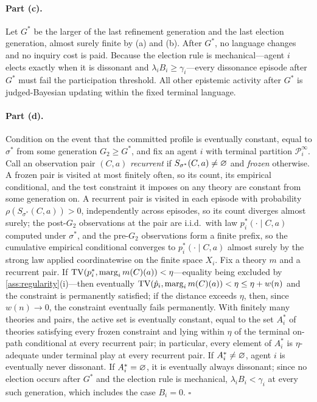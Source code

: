 \paragraph{Part (c).}
Let $G^{*}$ be the larger of the last refinement generation and the last
election generation, almost surely finite by (a) and (b).  After $G^{*}$,
no language changes and no inquiry cost is paid.  Because the election rule
is mechanical---agent $i$ elects exactly when it is dissonant and
$\lambda_iB_i\geq\gamma_i$---every dissonance episode after $G^{*}$ must
fail the participation threshold.  All other epistemic activity after
$G^{*}$ is judged-Bayesian updating within the fixed terminal language.

\paragraph{Part (d).}
Condition on the event that the committed profile is eventually constant,
equal to $\sigma^{*}$ from some generation $G_2\geq G^{*}$, and fix an
agent $i$ with terminal partition $\mathcal P_i^{\infty}$.  Call an
observation pair $(C,a)$ \emph{recurrent} if
$S_{\sigma^{*}}(C,a)\neq\varnothing$ and \emph{frozen} otherwise.  A frozen
pair is visited at most finitely often, so its count, its empirical
conditional, and the test constraint it imposes on any theory are constant
from some generation on.  A recurrent pair is visited in each episode with
probability $\rho(S_{\sigma^{*}}(C,a))>0$, independently across episodes, so
its count diverges almost surely; the post-$G_2$ observations at the pair
are i.i.d.\ with law $p_i^{*}(\cdot\mid C,a)$ computed under $\sigma^{*}$,
and the pre-$G_2$ observations form a finite prefix, so the cumulative
empirical conditional converges to $p_i^{*}(\cdot\mid C,a)$ almost surely
by the strong law applied coordinatewise on the finite space $X_i$.  Fix a
theory $m$ and a recurrent pair.  If
$\operatorname{TV}(p_i^{*},\operatorname{marg}_{i}m(C)(a))<\eta$---equality being excluded by
\cref{ass:regularity}(i)---then eventually
$\operatorname{TV}(\hat p_i,\operatorname{marg}_{i}m(C)(a))<\eta\leq\eta+w(n)$ and the constraint is
permanently satisfied; if the distance exceeds $\eta$, then, since
$w(n)\to0$, the constraint eventually fails permanently.  With finitely
many theories and pairs, the active set is eventually constant, equal to
the set $A_i^{*}$ of theories satisfying every frozen constraint and lying
within $\eta$ of the terminal on-path conditional at every recurrent pair;
in particular, every element of $A_i^{*}$ is $\eta$-adequate under terminal
play at every recurrent pair.  If $A_i^{*}\neq\varnothing$, agent $i$ is
eventually never dissonant.  If $A_i^{*}=\varnothing$, it is eventually
always dissonant; since no election occurs after $G^{*}$ and the election
rule is mechanical, $\lambda_iB_i<\gamma_i$ at every such generation, which
includes the case $B_i=0$.  \hfill$\square$

